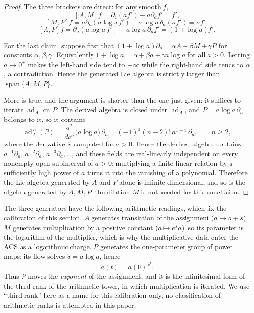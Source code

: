 \begin{proof}
The three brackets are direct: for any smooth $f$,
\[
  [A,M]f=\partial_a\!\left(a f'\right)-a\partial_a f'=f' ,
\]
\[
  [M,P]f=a\partial_a\!\left(a\log a\,f'\right)
        -a\log a\,\partial_a\!\left(a f'\right)
        =a f' ,
\]
\[
  [A,P]f=\partial_a\!\left(a\log a\,f'\right)
        -a\log a\,\partial_a f'
        =\left(1+\log a\right)f' .
\]

For the last claim, suppose first that $(1+\log a)\partial_a=\alpha A+\beta M+\gamma P$
for constants $\alpha,\beta,\gamma$.  Equivalently
$1+\log a=\alpha+\beta a+\gamma a\log a$ for all $a>0$.  Letting
$a\to0^{+}$ makes the left-hand side tend to $-\infty$ while the right-hand
side tends to $\alpha$, a contradiction.  Hence the generated Lie algebra is
strictly larger than $\operatorname{span}\{A,M,P\}$.

More is true, and the argument is shorter than the one just given: it suffices
to iterate $\operatorname{ad}_A$ on $P$.  The derived algebra is closed under
$\operatorname{ad}_A$, and $P=a\log a\,\partial_a$ belongs to it, so it contains
\[
  \operatorname{ad}_A^{\,n}(P)
  =\frac{d^n}{da^n}\bigl(a\log a\bigr)\,\partial_a
  =(-1)^n(n-2)!\,a^{1-n}\,\partial_a,
  \qquad n\ge2 ,
\]
where the derivative is computed for $a>0$.  Hence the derived algebra contains
$a^{-1}\partial_a,\ a^{-2}\partial_a,\ a^{-3}\partial_a,\ldots$, and these
fields are real-linearly independent on every nonempty open subinterval of
$a>0$: multiplying a finite linear relation by a sufficiently high power of $a$
turns it into the vanishing of a polynomial.  Therefore the Lie algebra
generated by $A$ and $P$ alone is infinite-dimensional, and so is the algebra
generated by $A,M,P$; the dilation $M$ is not needed for this conclusion.
\end{proof}

The three generators have the following arithmetic readings, which fix the
calibration of this section.  $A$ generates translation of the assignment
($a\mapsto a+s$).  $M$ generates multiplication by a positive constant
($a\mapsto e^{s}a$), so its parameter is the logarithm of the multiplier, which
is why the multiplicative data enter the ACS as a logarithmic charge.  $P$
generates the one-parameter group of power maps: its flow solves
$\dot a=a\log a$, hence
\[
  a(t)=a(0)^{\,e^{t}} .
\]
Thus $P$ moves the \emph{exponent} of the assignment, and it is the infinitesimal
form of the third rank of the arithmetic tower, in which multiplication is
iterated.  We use ``third rank'' here as a name for this calibration only; no
classification of arithmetic ranks is attempted in this paper.

